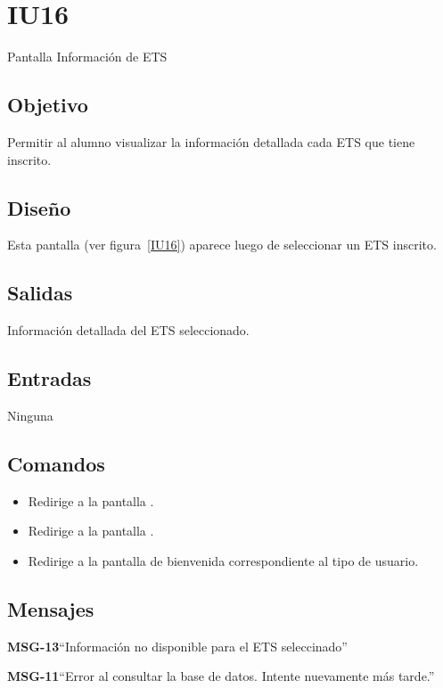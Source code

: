 \section{IU16}{Pantalla Información de ETS}

\subsection{Objetivo}
Permitir al alumno visualizar la información detallada cada ETS que tiene inscrito.

\subsection{Diseño}
Esta pantalla  (ver figura~\ref{IU16}) aparece luego de seleccionar un ETS inscrito. 


\subsection{Salidas}

Información detallada del ETS seleccionado. 

\subsection{Entradas}
Ninguna


\subsection{Comandos}
\begin{itemize}
	\item {} Redirige a la pantalla .
    \item {} Redirige a la pantalla .
    \item {} Redirige a la pantalla de bienvenida correspondiente al tipo de usuario.
\end{itemize}

\subsection{Mensajes}

\begin{Citemize}
	\item {\bf MSG-13}{``Información no disponible para el ETS seleccinado''}
	\item {\bf MSG-11}{``Error al consultar la base de datos. Intente nuevamente más tarde.''}
\end{Citemize}


